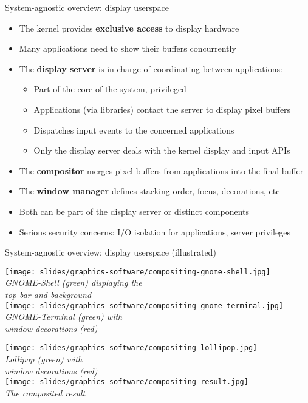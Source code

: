 \begin{frame}{System-agnostic overview: display userspace}
  \begin{itemize}
  \item The kernel provides \textbf{exclusive access} to display hardware
  \item Many applications need to show their buffers concurrently
  \item The \textbf{display server} is in charge of coordinating between applications:
    \begin{itemize}
    \item Part of the core of the system, privileged
    \item Applications (via libraries) contact the server to display pixel buffers
    \item Dispatches input events to the concerned applications
    \item Only the display server deals with the kernel display and input APIs
    \end{itemize}
  \item The \textbf{compositor} merges pixel buffers from applications into the final buffer
  \item The \textbf{window manager} defines stacking order, focus, decorations, etc
  \item Both can be part of the display server or distinct components
  \item Serious security concerns: I/O isolation for applications, server privileges
  \end{itemize}
\end{frame}

\begin{frame}{System-agnostic overview: display userspace (illustrated)}

  \begin{minipage}[t]{0.49\textwidth}
    \centering
    \texttt{[image: slides/graphics-software/compositing-gnome-shell.jpg]}\\
    \textit{\small GNOME-Shell (green) displaying the\\ top-bar and background}\\
    \vspace{0.5em}
    \texttt{[image: slides/graphics-software/compositing-gnome-terminal.jpg]}\\
    \textit{\small GNOME-Terminal (green) with\\ window decorations (red)}
  \end{minipage}
  \hfill
  \begin{minipage}[t]{0.49\textwidth}
    \centering
    \texttt{[image: slides/graphics-software/compositing-lollipop.jpg]}\\
    \textit{\small Lollipop (green) with\\ window decorations (red)}\\
    \vspace{0.5em}
    \texttt{[image: slides/graphics-software/compositing-result.jpg]}\\
    \textit{\small The composited result}
  \end{minipage}
\end{frame}

